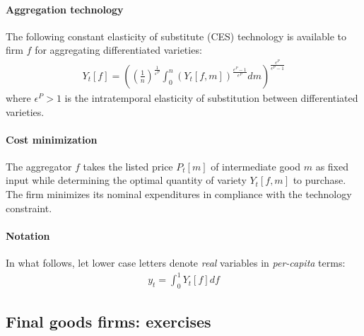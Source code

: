 \paragraph{Aggregation technology}
The following constant elasticity of substitute (CES) technology is available to firm \(f\) for aggregating differentiated varieties:
\begin{align}
Y_{t}[f] = {\left({\left(\frac{1}{n}\right)}^{\frac{1}{\varepsilon^{P}}} \int_{0}^{n} {(Y_{t}[f,m])}^{\frac{\epsilon^{P}-1}{\epsilon^{P}}} dm\right)}^{\frac{\epsilon^{P}}{\epsilon^{P}-1}} \label{eq:NewKeynesian.Firms.Aggregator}
\end{align}
where \(\epsilon^{P}>1\) is the intratemporal elasticity of substitution between differentiated varieties.

\paragraph{Cost minimization}
The aggregator \(f\) takes the listed price \(P_{t}[m]\) of intermediate good \(m\) as fixed input
  while determining the optimal quantity of variety \(Y_{t}[f,m]\) to purchase.
The firm minimizes its nominal expenditures in compliance with the technology constraint.

\paragraph{Notation}
In what follows, let lower case letters denote \emph{real} variables in \emph{per-capita} terms:
\begin{align*}
y_{t} = \int_{0}^{1} Y_{t}[f] df
\end{align*}

\subsection{Final goods firms: exercises}

